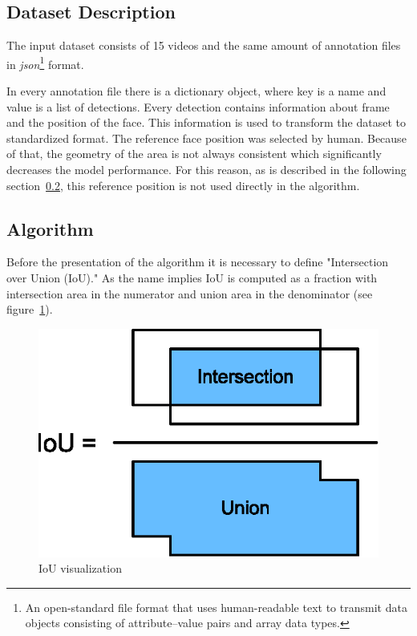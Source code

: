 \subsection{Dataset Description}\label{subsec:dataset-description}
The input dataset consists of 15 videos and the same amount of annotation files in \textit{json}\footnote{An
open-standard file format that uses human-readable text to transmit data objects consisting of attribute–value pairs
and array data types.} format.

In every annotation file there is a dictionary object, where key is a name and value is a list of detections.
Every detection contains information about frame and the position of the face.
This information is used to transform the dataset to standardized format.
The reference face position was selected by human.
Because of that, the geometry of the area is not always consistent which significantly decreases the model performance.
For this reason, as is described in the following section~\ref{subsec:algorithm}, this reference position is not
used directly in the algorithm.

\subsection{Algorithm}\label{subsec:algorithm}
Before the presentation of the algorithm it is necessary to define "Intersection over Union (IoU)."
As the name implies IoU is computed as a fraction with intersection area in the numerator and union area in the
denominator (see figure~\ref{fig:iou}).

\begin{figure}[H]
    \centering
    \includegraphics{images/implementation/iou.eps}
    \caption{IoU visualization\cite{IoU}}
    \label{fig:iou}
\end{figure}

